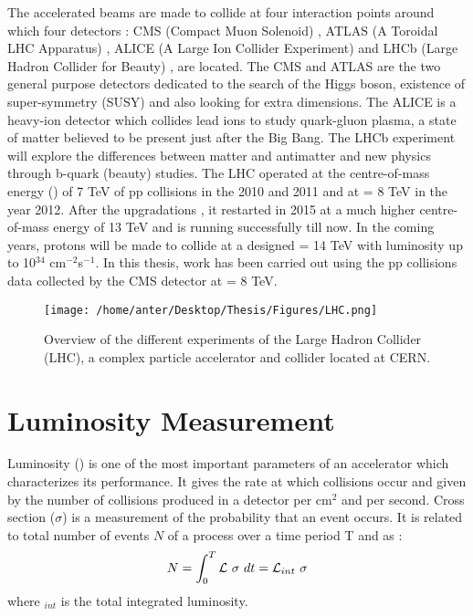 The accelerated beams are made to collide at four interaction points around which four detectors : CMS (Compact Muon Solenoid) \cite{Chatrchyan:2008aa,Bayatian:2006nff,Ball:2007zza}, ATLAS (A Toroidal LHC Apparatus) \cite{Aad:2008zzm}, ALICE (A Large Ion Collider Experiment) \cite{Aamodt:2008zz} and LHCb (Large Hadron Collider for Beauty) \cite{Alves:2008zz}, are located. The CMS and ATLAS are the two general purpose detectors dedicated to the search of the Higgs boson, existence of super-symmetry (SUSY) and also looking for extra dimensions. The ALICE is a heavy-ion detector which collides lead ions to study quark-gluon plasma, a state of matter believed to be present just after the Big Bang. The LHCb experiment will explore the differences between matter and antimatter and new physics through b-quark (beauty) studies. The LHC operated at the centre-of-mass energy (\cme) of 7 TeV of pp collisions in the 2010 and 2011 and at \cme = 8 TeV in the year 2012. After the upgradations , it restarted in 2015 at a much higher centre-of-mass energy of 13 TeV and is running successfully till now. In the coming years, protons will be made to collide at a designed \cme = 14 TeV with luminosity up to 10$^{34}$ cm$^{-2}$s$^{-1}$. In this thesis, work has been carried out using the pp collisions data collected by the CMS detector at \cme = 8 TeV.

\begin{figure}[!h]
 \begin{center} 
 \hspace*{-5mm}
 \texttt{[image: /home/anter/Desktop/Thesis/Figures/LHC.png]}\\
 \vspace*{5mm}
 \caption[LHC]{Overview of the different experiments of the Large Hadron Collider (LHC), a complex particle accelerator and collider located at CERN.\footnotemark}
 \label{fig:LHC}
 \end{center}
\end{figure}

\section{Luminosity Measurement}
Luminosity (\lumi) is one of the most important parameters of an accelerator which characterizes its performance. It gives the rate at which collisions occur and given by the number of collisions produced in a detector per cm$^2$ and per second. Cross section ($\sigma$) is a measurement of the probability that an event occurs. It is related to total number of events $N$ of a process over a time period T and \lumi as :
\begin{equation}
N = \int_{0}^{T} \mathcal{L}~\sigma~dt = \mathcal{L}_{int}~\sigma
\end{equation}
where \lumi$_{int}$ is the total integrated luminosity.


